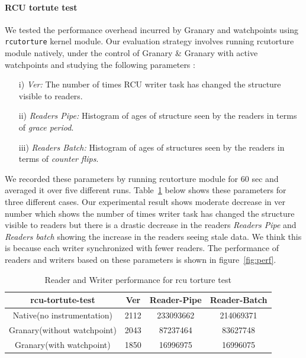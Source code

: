 \paragraph{RCU tortute test} We tested the performance overhead incurred by Granary and watchpoints using \texttt{rcutorture} kernel module. Our evaluation strategy involves running rcutorture module natively, under the control of Granary \& Granary with active watchpoints and studying the following parameters :
\begin{enumerate}
	\item[i)] \emph{Ver:} The number of times RCU writer task has changed the structure visible to readers.
	\item[ii)] \emph{Readers Pipe:} Histogram of ages of structure seen by the readers in terms of \emph{grace period}.
	\item[iii)] \emph{Readers Batch:} Histogram of ages of structures seen by the readers in terms of \emph{counter flips}.
\end{enumerate}
We recorded these parameters by running rcutorture module for 60 sec and averaged it over five different runs. Table~\ref{table:nonlin} below shows these parameters for three different cases. Our experimental result shows moderate decrease in ver number which shows the number of times writer task has changed the structure visible to readers but there is a drastic decrease in the readers \emph{Readers Pipe} and \emph{Readers batch} showing the increase in the readers seeing stale data. We think this is because each writer synchronized with fewer readers. The performance of readers and writers based on these parameters is shown in figure~\ref{fig:perf}.

\begin{table}[thp!]
\caption{Reader and Writer performance for rcu torture test}
\centering
\begin{tabular}{c c c c}
\hline\hline
rcu-tortute-test & Ver & Reader-Pipe & Reader-Batch  \\ [0.5ex]
\hline
Native(no instrumentation) & 2112 & 233093662 & 214069371 \\
Granary(without watchpoint) & 2043 & 87237464 & 83627748 \\
Granary(with watchpoint) & 1850 & 16996975 & 16996075 \\[1ex]
\hline
\end{tabular}
\label{table:nonlin}
\end{table}

